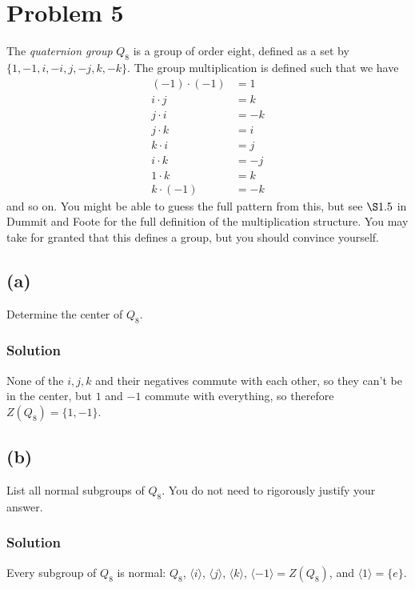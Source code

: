 \documentclass[fleqn]{article}
\begin{document}
    \section{Problem 5}
    The \textit{quaternion group} $Q_8$ is a group of order eight, defined as a set by $\{1, -1, i, -i, j, -j, k, -k\}$.  The group multiplication is defined such that we have
    \begin{align}
        (-1) \cdot (-1) &= 1 \\
        i \cdot j &= k \\
        j \cdot i &= -k \\
        j \cdot k &= i \\
        k \cdot i &= j \\
        i \cdot k &= -j \\
        1 \cdot k &= k \\
        k \cdot (-1) &= -k
    \end{align}
    and so on.  You might be able to guess the full pattern from this, but see $\S1.5$ in Dummit and Foote for the full definition of the multiplication structure.  You may take for granted that this defines a group, but you should convince yourself.
        
        \subsection{(a)}
        Determine the center of $Q_8$.
            
            \subsubsection{Solution}
            None of the $i, j, k$ and their negatives commute with each other, so they can't be in the center, but $1$ and $-1$ commute with everything, so therefore $Z(Q_8) = \{1, -1\}$.
        
        \subsection{(b)}
        List all normal subgroups of $Q_8$.  You do not need to rigorously justify your answer.
            
            \subsubsection{Solution}
            Every subgroup of $Q_8$ is normal: $Q_8$, $\langle i \rangle$, $\langle j \rangle$, $\langle k \rangle$, $\langle -1 \rangle = Z(Q_8)$, and $\langle 1 \rangle = \{e\}$.
        
\end{document}
